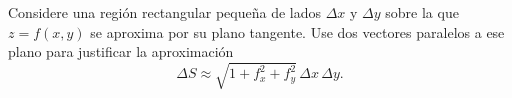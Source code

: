 Considere una región rectangular pequeña de lados $\Delta x$ y $\Delta y$ sobre la que $z=f(x,y)$ se aproxima por su plano tangente. Use dos vectores paralelos a ese plano para justificar la aproximación
\[
\Delta S\approx\sqrt{1+f_x^2+f_y^2}\,\Delta x\,\Delta y.
\]
